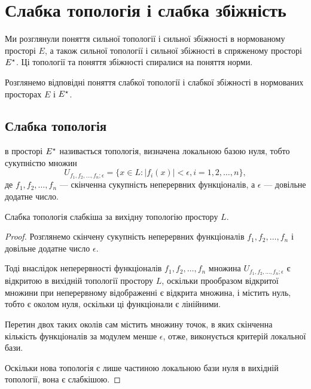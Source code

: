 \chapter{Слабка топологія і слабка збіжність}

Ми розглянули поняття сильної топології і сильної
збіжності в нормованому просторі $E$, а також сильної
топології і сильної збіжності в спряженому просторі $E^\star$.
Ці топології та поняття збіжності спиралися на поняття норми.

Розглянемо відповідні поняття слабкої топології і слабкої
збіжності в нормованих просторах $E$ і $E^\star$.

\section{Слабка топологія}

\begin{definition}
 в просторі $E^\star$
називається топологія, визначена локальною базою нуля,
тобто сукупністю множин
\begin{equation*}
    U_{f_1, f_2, \dots, f_n; \epsilon} =
    \{ x \in L: |f_i(x)| < \epsilon, i = 1, 2, \dots, n\},
\end{equation*}
де $f_1, f_2, \dots, f_n$ --- скінченна сукупність неперервних
функціоналів, а $\epsilon$ --- довільне додатне число.
\end{definition}

\begin{lemma}
Слабка топологія слабкіша за вихідну топологію простору $L$.
\end{lemma}

\begin{proof}
Розглянемо скінчену сукупність неперервних
функціоналів $f_1, f_2, \dots, f_n$ і довільне додатне число $\epsilon$.

Тоді внаслідок неперервності функціоналів $f_1, f_2, \dots, f_n$
множина $U_{f_1, f_2, \dots, f_n; \epsilon}$
є відкритою в вихідній топології простору $L$,
оскільки прообразом відкритої множини
при неперервному відображенні є відкрита множина,
і містить нуль, тобто є околом нуля,
оскільки ці функціонали є лінійними.

Перетин двох таких околів сам містить множину точок,
в яких скінченна кількість функціоналів за модулем менше $\epsilon$,
отже, виконується критерій локальної бази.

Оскільки нова топологія є лише частиною локальною бази нуля
в вихідній топології, вона є слабкішою. 
\end{proof}

